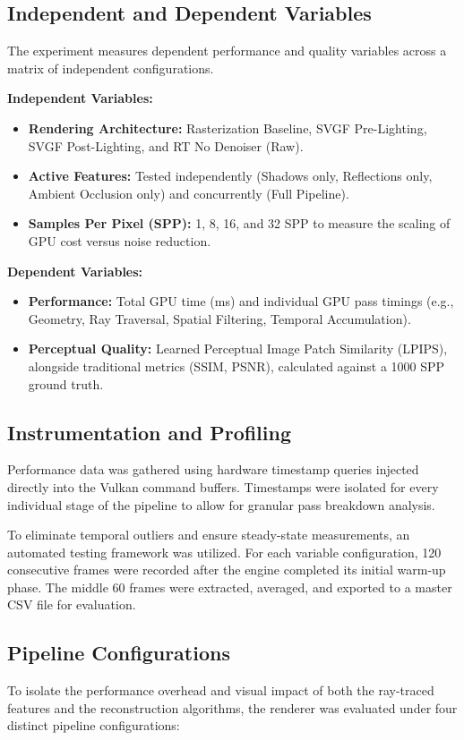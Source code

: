 \documentclass[12pt,a4paper]{report}
\begin{document}
\subsection{Independent and Dependent Variables}
The experiment measures dependent performance and quality variables across a matrix of independent configurations.

\textbf{Independent Variables:}
\begin{itemize}
    \item \textbf{Rendering Architecture:} Rasterization Baseline, SVGF Pre-Lighting, SVGF Post-Lighting, and RT No Denoiser (Raw).
    \item \textbf{Active Features:} Tested independently (Shadows only, Reflections only, Ambient Occlusion only) and concurrently (Full Pipeline).
    \item \textbf{Samples Per Pixel (SPP):} 1, 8, 16, and 32 SPP to measure the scaling of GPU cost versus noise reduction.
\end{itemize}

\textbf{Dependent Variables:}
\begin{itemize}
    \item \textbf{Performance:} Total GPU time (ms) and individual GPU pass timings (e.g., Geometry, Ray Traversal, Spatial Filtering, Temporal Accumulation).
    \item \textbf{Perceptual Quality:} Learned Perceptual Image Patch Similarity (LPIPS), alongside traditional metrics (SSIM, PSNR), calculated against a 1000 SPP ground truth.
\end{itemize}

\subsection{Instrumentation and Profiling}
Performance data was gathered using hardware timestamp queries injected directly into the Vulkan command buffers. Timestamps were isolated for every individual stage of the pipeline to allow for granular pass breakdown analysis. 

To eliminate temporal outliers and ensure steady-state measurements, an automated testing framework was utilized. For each variable configuration, 120 consecutive frames were recorded after the engine completed its initial warm-up phase.
The middle 60 frames were extracted, averaged, and exported to a master CSV file for evaluation.

\subsection{Pipeline Configurations}
To isolate the performance overhead and visual impact of both the ray-traced features and the reconstruction algorithms, the renderer was evaluated under four distinct pipeline configurations:
\end{document}
